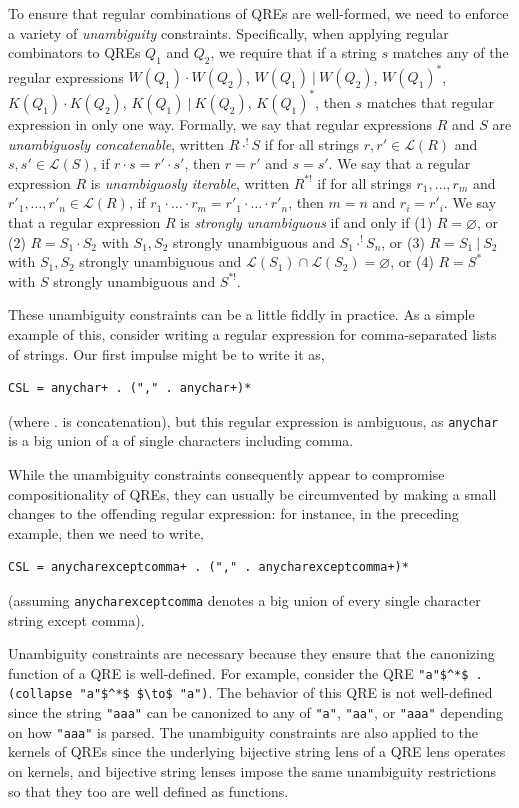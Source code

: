 \documentclass[acmsmall,screen]{acmart}
\newcommand{\sep}{\ensuremath{\ | \ }}
\newcommand{\cd}[1]{\lstinline[backgroundcolor=\color{white}]$#1$}
\begin{document}
To ensure that regular combinations of QREs are well-formed, we need
to enforce a variety of {\em unambiguity} constraints.  
Specifically, when applying regular combinators to QREs $Q_1$ and $Q_2$, we require that
if a string $s$ matches any of the regular expressions $W(Q_1) \cdot W(Q_2)$,
\quad $W(Q_1) \sep W(Q_2)$, \quad $W(Q_1)^*$, \quad $K(Q_1) \cdot K(Q_2)$,
\quad $K(Q_1) \sep K(Q_2)$, \quad $K(Q_1)^*$, then $s$ matches that regular
expression in only one way.
Formally, we say that regular expressions $R$ and $S$ are
\textit{unambiguosly concatenable}, written $R \cdot^! S$ if for all strings
$r, r' \in \mathcal{L}(R)$ and $s, s' \in \mathcal{L}(S)$, if $r \cdot s = r'
\cdot s'$, then $r = r'$ and $s = s'$. We say that a regular expression $R$ is
\textit{unambiguosly iterable}, written $R^{*!}$ if for all strings $r_1,
\ldots, r_m$ and $r'_1, \ldots, r'_n \in \mathcal{L}(R)$, if $r_1 \cdot \ldots
\cdot r_m = r'_1 \cdot \ldots \cdot r'_n$, then $m = n$ and $r_i = r'_i$. We say
that a regular expression $R$ is \textit{strongly unambiguous} \cite{Sippu1988}
if and only if (1) $R = \varnothing$, or (2) $R = S_1 \cdot S_2$ with $S_1,
S_2$ strongly unambiguous and $S_1 \cdot^! S_n$, or (3) $R = S_1 \sep S_2$ with
$S_1, S_2$ strongly unambiguous and $\mathcal{L}(S_1) \cap \mathcal{L}(S_2) =
\varnothing$, or (4) $R = S^*$ with $S$ strongly unambiguous and $S^{*!}$.

These unambiguity constraints can be a little fiddly in practice. As a simple example of this, consider writing a regular expression for comma-separated lists of strings. Our first impulse might be to write it as,
\begin{lstlisting}
CSL = anychar+ . ("," . anychar+)*
\end{lstlisting}
(where . is concatenation), but this regular expression is ambiguous, as \lstinline|anychar| is a big union of a of single characters including comma.

While the unambiguity constraints consequently appear to compromise compositionality of QREs, they can usually be circumvented by making a small changes to the offending regular expression: for instance, in the preceding example, then we need to write,
\begin{lstlisting}
CSL = anycharexceptcomma+ . ("," . anycharexceptcomma+)*
\end{lstlisting}
(assuming \lstinline|anycharexceptcomma| denotes a big union of every single character string except comma). 

Unambiguity constraints are necessary because they ensure that the canonizing function of a QRE is well-defined.
For example, consider the QRE \lstinline|"a"$^*$ . (collapse "a"$^*$ $\to$ "a")|. The
behavior of this QRE is not well-defined since the string
\cd{"aaa"} can be canonized to any of \cd{"a"}, \cd{"aa"}, or \cd{"aaa"}
depending on how \cd{"aaa"} is parsed. The unambiguity constraints are also applied to the kernels of QREs since the underlying
bijective string lens of a QRE lens operates on kernels, and bijective string lenses
impose the same unambiguity restrictions so that they too are well defined as
functions.
\end{document}

